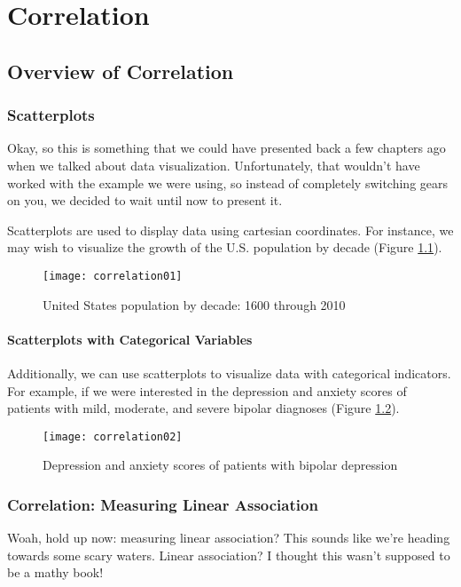 
\chapter{Correlation}

\section{Overview of Correlation}

\subsection{Scatterplots}
Okay, so this is something that we could have presented back a few chapters ago when we talked about data visualization. Unfortunately, that wouldn't have worked with the example we were using, so instead of completely switching gears on you, we decided to wait until now to present it.

Scatterplots are used to display data using cartesian coordinates. For instance, we may wish to visualize the growth of the U.S. population by decade (Figure \ref{fig:correlation01}).

\begin{figure}[h]
\texttt{[image: correlation01]}
\label{fig:correlation01}
\caption{United States population by decade: 1600 through 2010}
\end{figure}

\subsubsection{Scatterplots with Categorical Variables}
Additionally, we can use scatterplots to visualize data with categorical indicators. For example, if we were interested in the depression and anxiety scores of patients with mild, moderate, and severe bipolar diagnoses (Figure \ref{fig:correlation02}).

\begin{figure}[h]
\texttt{[image: correlation02]}
\label{fig:correlation02}
\caption{Depression and anxiety scores of patients with bipolar depression}
\end{figure}

\subsection{Correlation: Measuring Linear Association}
Woah, hold up now: measuring linear association? This sounds like we're heading towards some scary waters. Linear association? I thought this wasn't supposed to be a mathy book!

